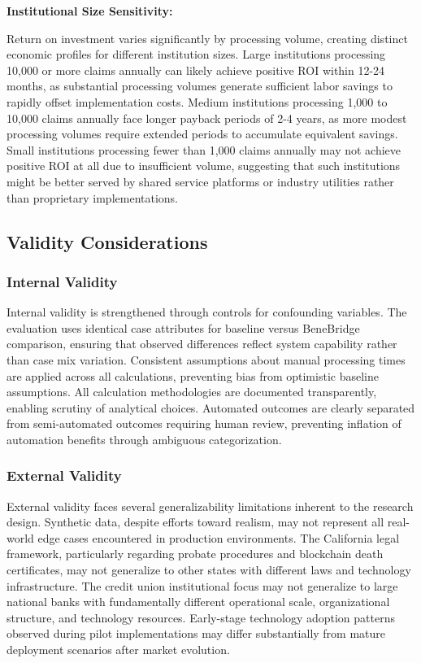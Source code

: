 \textbf{Institutional Size Sensitivity:}

Return on investment varies significantly by processing volume, creating distinct economic profiles for different institution sizes. Large institutions processing 10,000 or more claims annually can likely achieve positive ROI within 12-24 months, as substantial processing volumes generate sufficient labor savings to rapidly offset implementation costs. Medium institutions processing 1,000 to 10,000 claims annually face longer payback periods of 2-4 years, as more modest processing volumes require extended periods to accumulate equivalent savings. Small institutions processing fewer than 1,000 claims annually may not achieve positive ROI at all due to insufficient volume, suggesting that such institutions might be better served by shared service platforms or industry utilities rather than proprietary implementations.

\subsection{Validity Considerations}

\subsubsection{Internal Validity}

Internal validity is strengthened through controls for confounding variables. The evaluation uses identical case attributes for baseline versus BeneBridge comparison, ensuring that observed differences reflect system capability rather than case mix variation. Consistent assumptions about manual processing times are applied across all calculations, preventing bias from optimistic baseline assumptions. All calculation methodologies are documented transparently, enabling scrutiny of analytical choices. Automated outcomes are clearly separated from semi-automated outcomes requiring human review, preventing inflation of automation benefits through ambiguous categorization.

\subsubsection{External Validity}

External validity faces several generalizability limitations inherent to the research design. Synthetic data, despite efforts toward realism, may not represent all real-world edge cases encountered in production environments. The California legal framework, particularly regarding probate procedures and blockchain death certificates, may not generalize to other states with different laws and technology infrastructure. The credit union institutional focus may not generalize to large national banks with fundamentally different operational scale, organizational structure, and technology resources. Early-stage technology adoption patterns observed during pilot implementations may differ substantially from mature deployment scenarios after market evolution.

